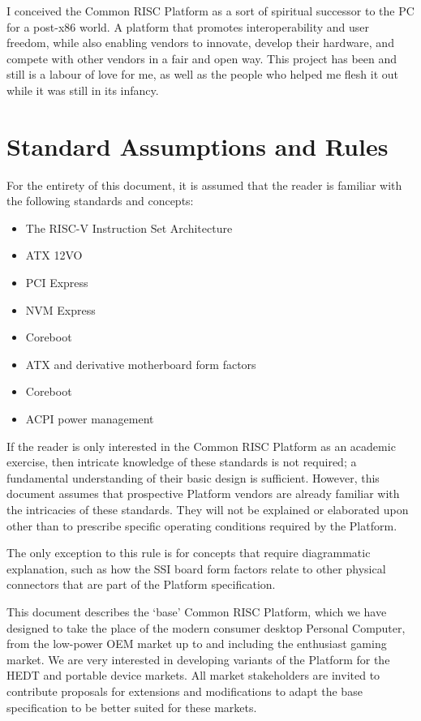 \documentclass[12pt]{report}
\begin{document}
I conceived the Common RISC Platform as a sort of spiritual successor to the PC for a post-x86 world. A platform that promotes
interoperability and user freedom, while also enabling vendors to innovate, develop their hardware, and compete with other
vendors in a fair and open way. This project has been and still is a labour of love for me, as well as the people who helped
me flesh it out while it was still in its infancy. 

\newpage


\section{Standard Assumptions and Rules}
For the entirety of this document, it is assumed that the reader is familiar with the following standards and concepts:

\begin{itemize}
	\item The RISC-V Instruction Set Architecture
	\item ATX 12VO
	\item PCI Express
	\item NVM Express
	\item Coreboot
	\item ATX and derivative motherboard form factors
	\item Coreboot
	\item ACPI power management
\end{itemize}

If the reader is only interested in the Common RISC Platform as an academic exercise, then intricate knowledge of these
standards is not required; a fundamental understanding of their basic design is sufficient. However, this document
assumes that prospective Platform vendors are already familiar with the intricacies of these standards. They will not
be explained or elaborated upon other than to prescribe specific operating conditions required by the Platform.

The only exception to this rule is for concepts that require diagrammatic explanation, such as how the SSI board form
factors relate to other physical connectors that are part of the Platform specification.

This document describes the `base' Common RISC Platform, which we have designed to take the place of the modern consumer
desktop Personal Computer, from the low-power OEM market up to and including the enthusiast gaming market. We are very
interested in developing variants of the Platform for the HEDT and portable device markets. All market stakeholders are
invited to contribute proposals for extensions and modifications to adapt the base specification to be better suited for
these markets.
\end{document}
